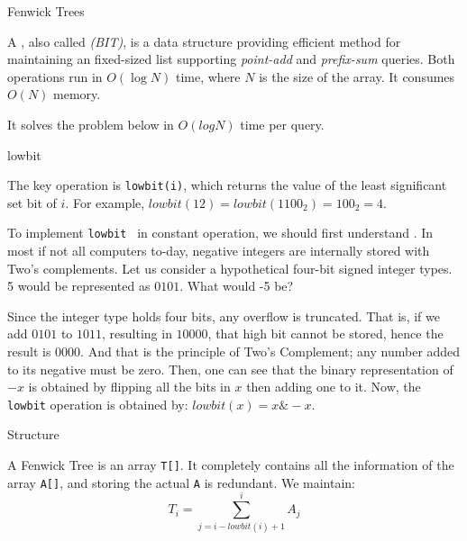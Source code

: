 \sec Fenwick Trees


A {\it {} }, also called {\it {} (BIT)}, is a data structure providing efficient method for maintaining an fixed-sized list supporting {\it point-add} and {\it prefix-sum} queries.  Both operations run in ${O}(\log N)$ time, where $N$ is the size of the array.  It consumes ${O}(N)$ memory.

It solves the problem below in $O(log N)$ time per query.

\secc lowbit


The key operation is {\tt lowbit(i)}, which returns the value of the least significant set bit of $i$.  For example, ${lowbit(12)} = {lowbit(1100_2)} = 100_2 = 4$.

To implement {\tt \iid lowbit } in constant operation, we should first understand  .  In most if not all computers to-day, negative integers are internally stored with Two's complements.  Let us consider a hypothetical four-bit signed integer types.  5 would be represented as $0101$.  What would -5 be?

Since the integer type holds four bits, any overflow is truncated.  That is, if we add $0101$ to $1011$, resulting in $10000$, that high bit cannot be stored, hence the result is $0000$.  And that is the principle of Two's Complement; any number added to its negative must be zero.  Then, one can see that the binary representation of $-x$ is obtained by flipping all the bits in $x$ then adding one to it.  Now, the {\tt lowbit} operation is obtained by: $lowbit(x) = x \& -x$.

\secc Structure

A Fenwick Tree is an array {\tt T[]}.  It completely contains all the information of the array {\tt A[]}, and storing the actual {\tt A} is redundant.  We maintain:
$$
  T_i = \sum_{j=i-lowbit(i)+1}^i A_j
$$

